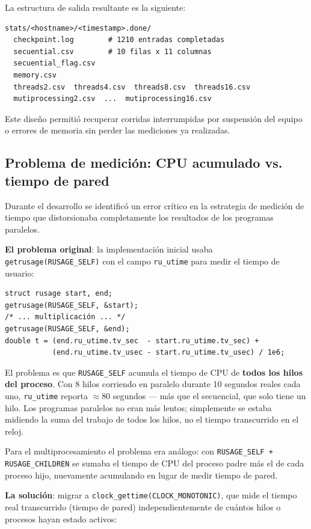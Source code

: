 \documentclass{article}
\begin{document}
La estructura de salida resultante es la siguiente:

\begin{verbatim}
stats/<hostname>/<timestamp>.done/
  checkpoint.log        # 1210 entradas completadas
  secuential.csv        # 10 filas x 11 columnas
  secuential_flag.csv
  memory.csv
  threads2.csv  threads4.csv  threads8.csv  threads16.csv
  mutiprocessing2.csv  ...  mutiprocessing16.csv
\end{verbatim}

Este diseño permitió recuperar corridas interrumpidas por suspensión del equipo o errores de memoria sin perder las mediciones ya realizadas.

\subsection{Problema de medición: CPU acumulado vs. tiempo de pared}
\label{sec:medicion}

Durante el desarrollo se identificó un error crítico en la estrategia de medición de tiempo que distorsionaba completamente los resultados de los programas paralelos.

\textbf{El problema original}: la implementación inicial usaba \texttt{getrusage(RUSAGE\_SELF)} con el campo \texttt{ru\_utime} para medir el tiempo de usuario:

\begin{verbatim}
struct rusage start, end;
getrusage(RUSAGE_SELF, &start);
/* ... multiplicación ... */
getrusage(RUSAGE_SELF, &end);
double t = (end.ru_utime.tv_sec  - start.ru_utime.tv_sec) +
           (end.ru_utime.tv_usec - start.ru_utime.tv_usec) / 1e6;
\end{verbatim}

El problema es que \texttt{RUSAGE\_SELF} acumula el tiempo de CPU de \textbf{todos los hilos del proceso}. Con 8 hilos corriendo en paralelo durante 10 segundos reales cada uno, \texttt{ru\_utime} reporta $\approx$80 segundos --- más que el secuencial, que solo tiene un hilo. Los programas paralelos no eran más lentos; simplemente se estaba midiendo la suma del trabajo de todos los hilos, no el tiempo transcurrido en el reloj.

Para el multiprocesamiento el problema era análogo: con \texttt{RUSAGE\_SELF + RUSAGE\_CHILDREN} se sumaba el tiempo de CPU del proceso padre más el de cada proceso hijo, nuevamente acumulando en lugar de medir tiempo de pared.

\textbf{La solución}: migrar a \texttt{clock\_gettime(CLOCK\_MONOTONIC)}, que mide el tiempo real transcurrido (tiempo de pared) independientemente de cuántos hilos o procesos hayan estado activos:
\end{document}
